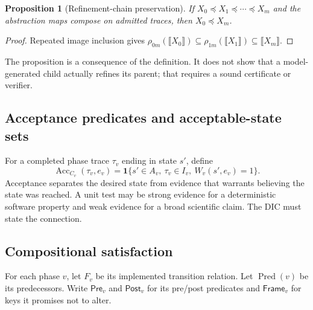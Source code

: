 \documentclass[11pt]{article}
\newtheorem{proposition}[definition]{Proposition}
\newcommand{\Acc}{\operatorname{Acc}}
\begin{document}
\begin{proposition}[Refinement-chain preservation]
If $X_0\preceq X_1\preceq\cdots\preceq X_m$ and the abstraction maps compose on admitted traces, then $X_0\preceq X_m$.
\end{proposition}
\begin{proof}
Repeated image inclusion gives
$\rho_{0m}(\llbracket X_0\rrbracket)\subseteq\rho_{1m}(\llbracket X_1\rrbracket)\subseteq\llbracket X_m\rrbracket$.
\end{proof}
The proposition is a consequence of the definition. It does not show that a model-generated child actually refines its parent; that requires a sound certificate or verifier.

\subsection{Acceptance predicates and acceptable-state sets}
For a completed phase trace $\tau_v$ ending in state $s'$, define
\[
\Acc_{C_v}(\tau_v,e_v)=\mathbf 1\{s'\in A_v,\ \tau_v\in I_v,\ W_v(s',e_v)=1\}.
\]
Acceptance separates the desired state from evidence that warrants believing the state was reached. A unit test may be strong evidence for a deterministic software property and weak evidence for a broad scientific claim. The DIC must state the connection.

\subsection{Compositional satisfaction}
\label{sec:composition}
For each phase $v$, let $F_v$ be its implemented transition relation. Let $\operatorname{Pred}(v)$ be its predecessors. Write $\mathsf{Pre}_v$ and $\mathsf{Post}_v$ for its pre/post predicates and $\mathsf{Frame}_v$ for keys it promises not to alter.
\end{document}

